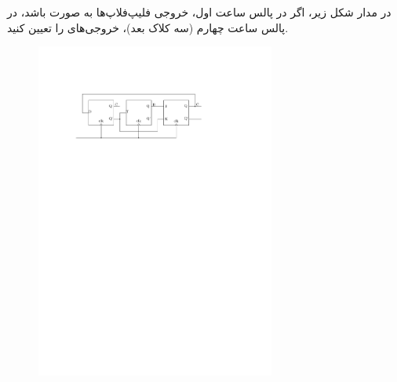
در مدار شکل زیر، اگر در پالس ساعت اول، خروجی فلیپ‌فلاپ‌ها به صورت  باشد، در پالس ساعت چهارم (سه کلاک بعد)، خروجی‌های  را تعیین کنید.

\newpage


\begin{figure}[h]
	\centering
	\includegraphics[width=0.7\textwidth]{fig/Q_basic5.pdf}
	\label{fig:Q_basic_5}
\end{figure}